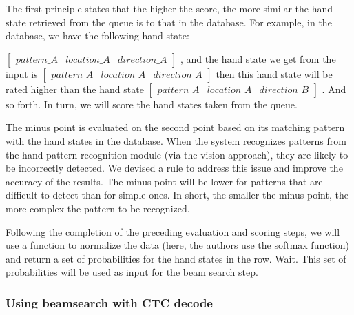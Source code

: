 The first principle states that the higher the score, the more similar the hand state retrieved from the queue is to that in the database. For example, in the database, we have the following hand state:

$\begin{bmatrix}
  pattern \_ A & location \_ A & direction \_ A
\end{bmatrix}$
, and the hand state we get from the input is 
$\begin{bmatrix}
  pattern \_ A & location \_ A & direction \_ A
\end{bmatrix}$
then this hand state will be rated higher than the hand state 
$\begin{bmatrix}
  pattern \_ A & location \_ A & direction \_ B
\end{bmatrix}$
. And so forth. In turn, we will score the hand states taken from the queue.

The minus point is evaluated on the second point based on its matching pattern with the hand states in the database. When the system recognizes patterns from the hand pattern recognition module (via the vision approach), they are likely to be incorrectly detected. We devised a rule to address this issue and improve the accuracy of the results. The minus point will be lower for patterns that are difficult to detect than for simple ones. In short, the smaller the minus point, the more complex the pattern to be recognized.


Following the completion of the preceding evaluation and scoring steps, we will use a function to normalize the data (here, the authors use the softmax function\cite{SoftMax}) and return a set of probabilities for the hand states in the row. Wait. This set of probabilities will be used as input for the beam search step.

\subsubsection{ Using beamsearch with CTC decode }

